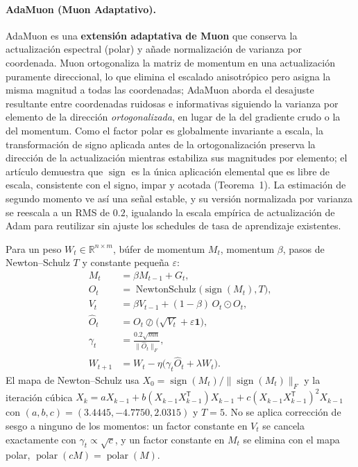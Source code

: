 \paragraph{AdaMuon (Muon Adaptativo).}
AdaMuon es una \textbf{extensión adaptativa de Muon} que conserva la actualización espectral (polar) y añade normalización de varianza por coordenada. Muon ortogonaliza la matriz de momentum en una actualización puramente direccional, lo que elimina el escalado anisotrópico pero asigna la misma magnitud a todas las coordenadas; AdaMuon aborda el desajuste resultante entre coordenadas ruidosas e informativas siguiendo la varianza por elemento de la dirección \emph{ortogonalizada}, en lugar de la del gradiente crudo o la del momentum. Como el factor polar es globalmente invariante a escala, la transformación de signo aplicada antes de la ortogonalización preserva la dirección de la actualización mientras estabiliza sus magnitudes por elemento; el artículo demuestra que $\operatorname{sign}$ es la única aplicación elemental que es libre de escala, consistente con el signo, impar y acotada (Teorema~1). La estimación de segundo momento ve así una señal estable, y su versión normalizada por varianza se reescala a un RMS de $0.2$, igualando la escala empírica de actualización de Adam para reutilizar sin ajuste los schedules de tasa de aprendizaje existentes.

Para un peso $W_t \in \mathbb{R}^{n \times m}$, búfer de momentum $M_t$, momentum $\beta$, pasos de Newton--Schulz $T$ y constante pequeña $\varepsilon$:
\begin{align}
M_t &= \beta M_{t-1} + G_t, \\
O_t &= \operatorname{NewtonSchulz}\bigl(\operatorname{sign}(M_t), T\bigr), \\
V_t &= \beta V_{t-1} + (1-\beta)\, O_t \odot O_t, \\
\widehat{O}_t &= O_t \oslash \bigl(\sqrt{V_t} + \varepsilon \mathbf{1}\bigr), \\
\gamma_t &= \frac{0.2\sqrt{mn}}{\|\widehat{O}_t\|_F}, \\
W_{t+1} &= W_t - \eta\bigl(\gamma_t \widehat{O}_t + \lambda W_t\bigr).
\end{align}
El mapa de Newton--Schulz usa $X_0 = \operatorname{sign}(M_t)/\|\operatorname{sign}(M_t)\|_F$ y la iteración cúbica $X_k = aX_{k-1} + b(X_{k-1}X_{k-1}^{\mathsf T})X_{k-1} + c(X_{k-1}X_{k-1}^{\mathsf T})^2X_{k-1}$ con $(a,b,c) = (3.4445, -4.7750, 2.0315)$ y $T = 5$. No se aplica corrección de sesgo a ninguno de los momentos: un factor constante en $V_t$ se cancela exactamente con $\gamma_t \propto \sqrt{c}$, y un factor constante en $M_t$ se elimina con el mapa polar, $\operatorname{polar}(cM) = \operatorname{polar}(M)$.

